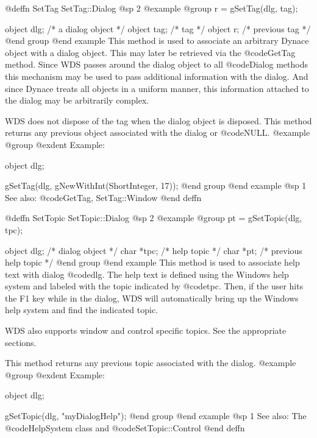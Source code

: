 @deffn {SetTag} SetTag::Dialog
@sp 2
@example
@group
r = gSetTag(dlg, tag);

object  dlg;   /*  a dialog object   */
object  tag;    /*  tag               */
object  r;      /*  previous tag      */
@end group
@end example
This method is used to associate an arbitrary Dynace object with a
dialog object.  This may later be retrieved via the @code{GetTag} method.
Since WDS passes around the dialog object to all @code{Dialog} methods
this mechanism may be used to pass additional information with the
dialog.  And since Dynace treats all objects in a uniform manner, this
information attached to the dialog may be arbitrarily complex.

WDS does not dispose of the tag when the dialog object is disposed.
This method returns any previous object associated with the dialog or
@code{NULL}.
@example
@group
@exdent Example:

object  dlg;

gSetTag(dlg, gNewWithInt(ShortInteger, 17));
@end group
@end example
@sp 1
See also:  @code{GetTag, SetTag::Window}
@end deffn











@deffn {SetTopic} SetTopic::Dialog
@sp 2
@example
@group
pt = gSetTopic(dlg, tpc);

object  dlg;    /*  dialog object         */
char    *tpc;   /*  help topic            */
char    *pt;    /*  previous help topic   */
@end group
@end example
This method is used to associate help text with dialog @code{dlg}.
The help text is defined using the Windows help system and labeled
with the topic indicated by @code{tpc}.  Then, if the user hits
the F1 key while in the dialog, WDS will automatically bring up
the Windows help system and find the indicated topic.

WDS also supports window and control specific topics.  See the appropriate
sections.

This method returns any previous topic associated with the dialog.
@example
@group
@exdent Example:

object  dlg;

gSetTopic(dlg, "myDialogHelp");
@end group
@end example
@sp 1
See also:  The @code{HelpSystem} class and @code{SetTopic::Control} 
@end deffn















